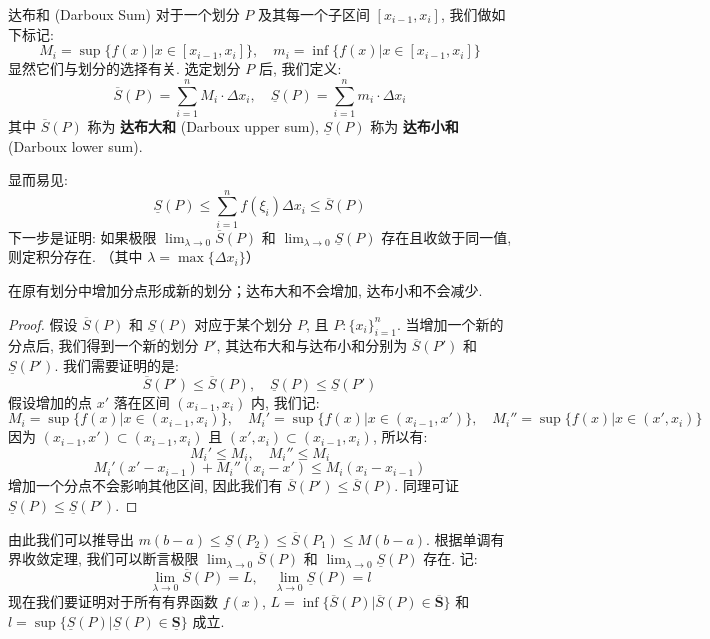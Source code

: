 \documentclass[a4paper,12pt]{ctexart}
\begin{document}
\newpage

\begin{mydef}{达布和 (Darboux Sum)}{}
对于一个划分 $P$ 及其每一个子区间 $[x_{i-1},x_i]$, 我们做如下标记: 
$$
M_i = \sup\{f(x)|x \in [x_{i-1},x_i]\}, \quad m_i = \inf\{f(x)|x \in [x_{i-1},x_i]\}
$$
显然它们与划分的选择有关. 选定划分 $P$ 后, 我们定义: 
$$
\overline{S}(P) = \sum_{i=1}^{n} M_i \cdot \Delta x_i , \quad \underline{S}(P) = \sum_{i=1}^{n} m_i \cdot \Delta x_i
$$
其中 $\overline{S}(P)$ 称为 \textbf{达布大和} (Darboux upper sum), $\underline{S}(P)$ 称为 \textbf{达布小和} (Darboux lower sum).
\end{mydef}

显而易见: 
$$
\underline{S}(P) \leq \sum_{i=1}^{n} f(\xi_i) \Delta x_i \leq \overline{S}(P)
$$
下一步是证明: 如果极限 $\lim_{\lambda \to 0} \overline{S}(P)$ 和 $\lim_{\lambda \to 0} \underline{S}(P)$ 存在且收敛于同一值, 则定积分存在. （其中 $\lambda = \max \{\Delta x_i\}$）

\begin{mylemma}{}{}
在原有划分中增加分点形成新的划分；达布大和不会增加, 达布小和不会减少.
\end{mylemma}

\begin{proof}
假设 $\overline{S}(P)$ 和 $\underline{S}(P)$ 对应于某个划分 $P$, 且 $P: \{x_i\}_{i=1}^n$. 当增加一个新的分点后, 我们得到一个新的划分 $P'$, 其达布大和与达布小和分别为 $\overline{S}(P')$ 和 $\underline{S}(P')$. 我们需要证明的是: 
$$
\overline{S}(P') \leq \overline{S}(P), \quad \underline{S}(P) \leq \underline{S}(P')
$$
假设增加的点 $x'$ 落在区间 $(x_{i-1},x_i)$ 内, 我们记: 
$$
M_i = \sup \{f(x)|x \in (x_{i-1},x_i)\}, \quad M_i' = \sup \{f(x)|x \in (x_{i-1},x')\}, \quad M_i'' = \sup \{f(x)| x \in (x', x_i)\}
$$
因为 $(x_{i-1},x') \subset (x_{i-1},x_i)$ 且 $(x', x_i) \subset (x_{i-1},x_i)$, 所以有: 
$$
M_i' \leq M_i, \quad M_i'' \leq M_i
$$
$$
M_i'(x'-x_{i-1}) + M_i''(x_i-x') \leq M_i(x_i - x_{i-1})
$$
增加一个分点不会影响其他区间, 因此我们有 $\overline{S}(P') \leq \overline{S}(P)$. 同理可证 $\underline{S}(P) \leq \underline{S}(P')$.
\end{proof}

由此我们可以推导出 $m(b-a) \leq \underline{S}(P_2) \leq \overline{S}(P_1) \leq M(b-a)$. 根据单调有界收敛定理, 我们可以断言极限 $\lim_{\lambda \to 0} \overline{S}(P)$ 和 $\lim_{\lambda \to 0} \underline{S}(P)$ 存在. 记: 
$$
\lim_{\lambda \to 0} \overline{S}(P)=L, \quad \lim_{\lambda \to 0} \underline{S}(P)=l
$$
现在我们要证明对于所有有界函数 $f(x)$, $L = \inf \{\overline{S}(P)|\overline{S}(P) \in \overline{\textbf{S}}\}$ 和 $l = \sup \{\underline{S}(P)|\underline{S}(P) \in \underline{\textbf{S}}\}$ 成立.
\end{document}
